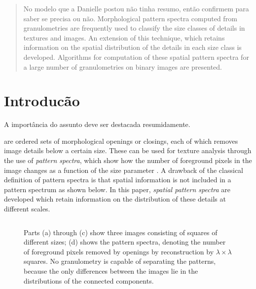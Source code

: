 \documentclass{sciposter}
\begin{document}
\begin{multicols}{3}

\begin{abstract}
No modelo que a Danielle postou não tinha resumo, então confirmem para saber se precisa ou não.
Morphological pattern spectra computed from granulometries are frequently used
to classify the size classes of details in textures and images. An extension 
of this technique, which retains information on the spatial 
distribution of the details in each size class is developed. Algorithms for
computation of these spatial pattern spectra for a large number of 
granulometries on binary images are presented. 
\end{abstract}

\section{Introducão}
A importância do assunto deve ser destacada resumidamente.

 are ordered sets of morphological openings or closings, each of
which removes image details below a certain size. These can be used for texture
analysis
through the use of \emph{pattern spectra}, which show how the number of 
foreground pixels in the image changes as a function of the size parameter 
\cite{maragos89:_patter}.
A drawback of the classical definition of pattern spectra is that spatial 
information is not included in a pattern spectrum as shown below.
 In this paper, \emph{spatial pattern spectra} are developed which retain information on the distribution of these details at different scales.
 

\newcommand{\imsize}{0.45\columnwidth}
\begin{figure}
\begin{center}
\begin{tabular}{c c}

\end{tabular}
\end{center}
\caption{ Parts (a) through (c) show three images consisting of squares of
different sizes;
(d) shows the pattern spectra, denoting the number of foreground pixels 
 removed by openings by reconstruction by $\lambda \times \lambda$ squares. No 
granulometry is capable of separating the patterns, because the only 
differences between the images lie in the distributions of the 
connected components. }\label{fig:blocks}
\end{figure}





\end{multicols}
\end{document}
